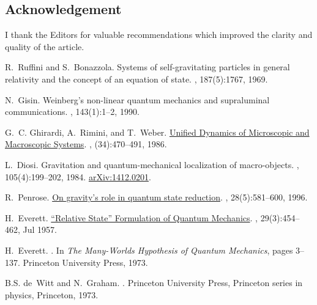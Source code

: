 \documentclass[12pt]{amsart}
\theoremstyle{definition}
\theoremstyle{plain}
\begin{document}
\subsection*{Acknowledgement}

I thank the Editors for valuable recommendations which improved the clarity and quality of the article.

\begin{thebibliography}{10}

R.~Ruffini and S.~Bonazzola.
\newblock Systems of self-gravitating particles in general relativity and the
  concept of an equation of state.
, 187(5):1767, 1969.

N.~Gisin.
\newblock Weinberg's non-linear quantum mechanics and supraluminal
  communications.
, 143(1):1--2, 1990.

G.~C. Ghirardi, A.~Rimini, and T.~Weber.
\newblock
  \href{https://www.researchgate.net/profile/Giancarlo\_Ghirardi/publication/224043655\_Unified\_Dynamics\_for\_Microscopic\_and\_Macroscopic\_Systems/links/0c960518ba67033416000000.pdf}{Unified
  Dynamics of Microscopic and Macroscopic Systems}.
, (34):470--491, 1986.

L.~Diosi.
\newblock Gravitation and quantum-mechanical localization of macro-objects.
, 105(4):199--202, 1984.
\newblock \href{http://arxiv.org/abs/1412.0201}{arXiv:1412.0201}.

R.~Penrose.
\newblock
  \href{http://blog.sciencenet.cn/upload/blog/file/2010/8/201081019170575880.pdf}{On
  gravity's role in quantum state reduction}.
, 28(5):581--600, 1996.

H.~Everett.
\newblock
  \href{http://stanford.library.usyd.edu.au/entries/qm-everett/}{``Relative
  State'' Formulation of Quantum Mechanics}.
, 29(3):454--462, Jul 1957.

H.~Everett.
.
\newblock In {\em {The Many-Worlds Hypothesis of Quantum Mechanics}}, pages
  3--137. Princeton University Press, 1973.

B.S. de~Witt and N.~Graham.
.
\newblock Princeton University Press, Princeton series in physics, Princeton,
  1973.


\end{thebibliography}
\end{document}
